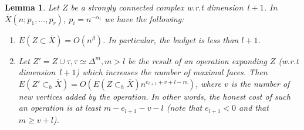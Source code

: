 \documentclass{article}
\theoremstyle{plain}
\newtheorem{lemma}[theorem]{Lemma}
\theoremstyle{definition}
\theoremstyle{remark}
\newcommand{\di}{dimension}
\begin{document}
\begin{lemma}\label{lem:upperBudgetCost}
    Let $Z$ be a strongly connected complex w.r.t \di \ $l+1$. In $\overline{X}(n;p_1,...,p_r)$, $p_i=n^{
    -\alpha_i}$ we have the following:
    \begin{enumerate}
        \item $E(Z\subset \overline{X})=O(n^\beta)$. In particular, the budget is less than $l+1$.
        \item Let $Z'=Z\cup \tau, \tau\simeq\Delta^m, m>l$ be the result of an operation expanding $Z$ (w.r.t \di\ $l+1$) which increases the number of maximal faces. Then $E(Z'\subset_h \overline{X})=O(E(Z\subset_h \overline{X})n^{e_{l+1}+v+l-m})$, where $v$ is the number of new vertices added by the operation.
        In other words, the honest cost of such an operation is at least $m-e_{l+1}-v-l$ (note that $e_{l+1}<0$ and that $m\ge v+l$).
    \end{enumerate}
\end{lemma}
\end{document}
